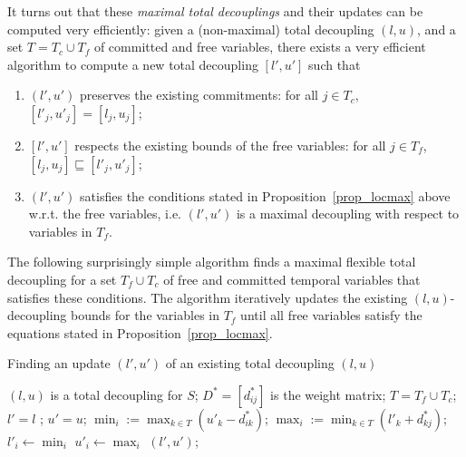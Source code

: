 It turns out that these \emph{maximal total decouplings} and their updates can be computed very efficiently: given a (non-maximal) total decoupling $(l, u)$, and a set $T = T_c \cup T_f$ of committed and free variables, %
there exists a very efficient algorithm to compute a new total decoupling 
$[l', u']$ such that
\begin{enumerate}
\item $(l',u')$ preserves the existing commitments: for all $j \in T_c$, $[l'_j, u'_j] =[l_j, u_j]$;
\item $[l', u']$ respects the existing bounds of the free variables: for all $j  \in T_f$, $[l_j, u_j] \sqsubseteq [ l'_j, u'_j ]$;
\item $(l', u')$ satisfies the conditions stated in Proposition~\ref{prop_locmax} above w.r.t. the free variables, i.e. $(l', u')$ is a maximal decoupling with respect to variables in $T_f$.
\end{enumerate}

The following surprisingly simple algorithm finds a maximal flexible total decoupling for a set $T_f \cup T_c$ of free and committed temporal variables that satisfies these conditions.
The algorithm iteratively updates the existing $(l, u)$-decoupling bounds for the variables in $T_f$ until all free variables satisfy the equations stated in Proposition~\ref{prop_locmax}.
\begin{algorithm}
\caption{Finding an update $(l', u')$ of an existing total decoupling $(l, u)$  }  
\label{alg.1}
\begin{algorithmic}[1]
\Require $(l, u)$ is a total decoupling for $S$; $D^* = [d^*_{ij}]$ is the weight matrix; $T = T_f \cup T_c$;
\State $l' = l$ ; $u' = u$;
\State $\min_i := \max_{k \in T} (u'_k - d^*_{ik})$; 
\State $\max_i := \min_{k \in T} (l'_k + d^*_{kj}) $;
\State $l'_i \gets \min_i$ 
\EndIf
{} 
\State $u'_i \gets \max_i$
\EndIf
\EndFor
\State \Return  $(l', u')$;   
\end{algorithmic}
\end{algorithm}

